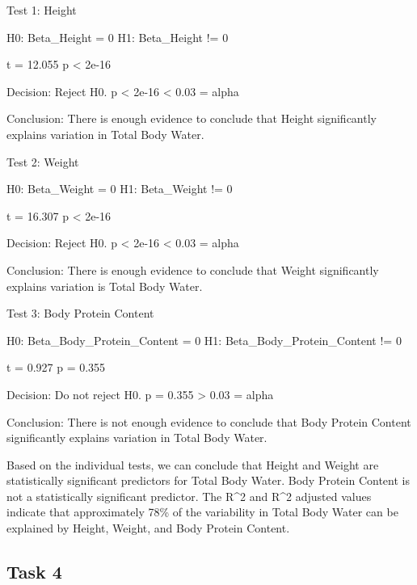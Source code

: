 \documentclass[
]{article}
\newenvironment{Shaded}{\begin{snugshade}}{\end{snugshade}}
\newcommand{\AttributeTok}[1]{\textcolor[rgb]{0.13,0.29,0.53}{#1}}
\newcommand{\FunctionTok}[1]{\textcolor[rgb]{0.13,0.29,0.53}{\textbf{#1}}}
\newcommand{\NormalTok}[1]{#1}
\newcommand{\OtherTok}[1]{\textcolor[rgb]{0.56,0.35,0.01}{#1}}
\newcommand{\SpecialCharTok}[1]{\textcolor[rgb]{0.81,0.36,0.00}{\textbf{#1}}}
\begin{document}
Test 1: Height

H0: Beta\_Height = 0 H1: Beta\_Height != 0

t = 12.055 p \textless{} 2e-16

Decision: Reject H0. p \textless{} 2e-16 \textless{} 0.03 = alpha

Conclusion: There is enough evidence to conclude that Height
significantly explains variation in Total Body Water.

Test 2: Weight

H0: Beta\_Weight = 0 H1: Beta\_Weight != 0

t = 16.307 p \textless{} 2e-16

Decision: Reject H0. p \textless{} 2e-16 \textless{} 0.03 = alpha

Conclusion: There is enough evidence to conclude that Weight
significantly explains variation is Total Body Water.

Test 3: Body Protein Content

H0: Beta\_Body\_Protein\_Content = 0 H1: Beta\_Body\_Protein\_Content !=
0

t = 0.927 p = 0.355

Decision: Do not reject H0. p = 0.355 \textgreater{} 0.03 = alpha

Conclusion: There is not enough evidence to conclude that Body Protein
Content significantly explains variation in Total Body Water.

Based on the individual tests, we can conclude that Height and Weight
are statistically significant predictors for Total Body Water. Body
Protein Content is not a statistically significant predictor. The R\^{}2
and R\^{}2 adjusted values indicate that approximately 78\% of the
variability in Total Body Water can be explained by Height, Weight, and
Body Protein Content.

\subsection{\texorpdfstring{\textbf{Task 4}}{Task 4}}\label{task-4}

\begin{Shaded}
\end{Shaded}
\end{document}
